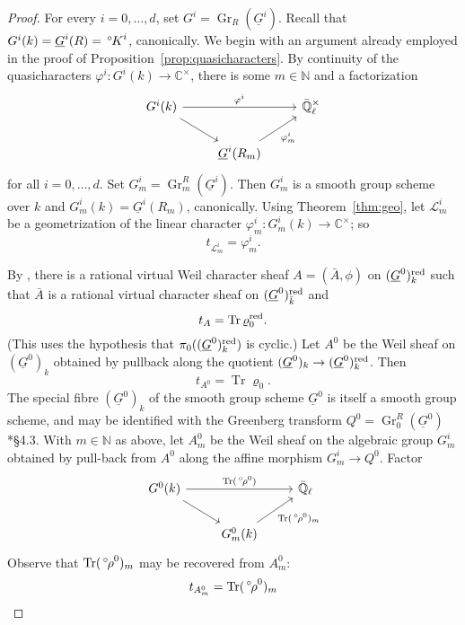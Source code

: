 \documentclass[10pt]{amsart}
\theoremstyle{plain}
\theoremstyle{definition}
\newcommand{\NN}{{\mathbb{N}}}
\newcommand{\CC}{{\mathbb{C}}}
\newcommand{\EE}{\mathbb{\bar Q}_\ell}
\newcommand{\bFq}{\bar{k}}
\newcommand{\Fq}{k}
\newcommand{\EEx}{\EE^\times}
\DeclareMathOperator{\Gr}{Gr}
\DeclareMathOperator{\trace}{Tr}
\newcommand{\trFrob}[1]{t_{#1}}
\newcommand{\cs}[1]{{\mathcal{#1}}}
\newcommand{\oK}{{\,^\circ \hskip-1pt K}}
\newcommand{\orho}{{\,^\circ \hskip-1pt \rho}}
\begin{document}
\begin{proof}
For every $i=0, \ldots ,d$, set $G^i = \Gr_{R}(\underline{G}^i)$.
Recall that $G^i(\Fq) = \underline{G}^i(R) = \oK^i$, canonically.
We begin with an argument already employed in the proof of Proposition~\ref{prop:quasicharacters}.
By continuity of the quasicharacters $\varphi^i : G^i(\Fq) \to \CC^\times$, there is some $m \in \NN$ and a factorization
\[
\begin{tikzcd}
G^i(\Fq) \arrow{rr}{\varphi^i} \arrow{rd} && \EEx\\
& \underline{G}^i(R_m) \arrow{ru}[swap]{\varphi^i_m} 
\end{tikzcd}
\] 
for all $i=0, \ldots, d$.
Set $G_m^i = \Gr_m^{R}(\underline{G}^i)$.
Then $G_m^i$ is a smooth group scheme over $\Fq$ and $G_m^i(\Fq) = \underline{G}^i(R_m)$, canonically.
Using Theorem~\ref{thm:geo}, let $\cs{L}^i_m$ be a geometrization of the linear character $\varphi^i_m: G_m^i(k) \to \CC^\times$; so
\[
\trFrob{\cs{L}^i_m} = \varphi^i_m.
\]

By \cite{lusztig:disconnected1}, there is a rational virtual Weil character sheaf $A = ({\bar A},\phi)$ on $(\underline{G}^0)_\Fq^\reductive$ such that ${\bar A}$ is a rational virtual character sheaf on $(\underline{G}^0)_{\bFq}^\reductive$ and
\[
\trFrob{A} = \trace \varrho_0^\reductive.
\]
(This uses the hypothesis that $\pi_0((\underline{G}^0)_\Fq^\reductive)$ is cyclic.)
%
Let $A^0$ be the Weil sheaf on $(\underline{G}^0)_\Fq$ obtained by pullback along the quotient $(\underline{G}^0)_\Fq \to (\underline{G}^0)_\Fq^\reductive$.
Then 
\[
\trFrob{A^0} = \trace \varrho_0.
\]
The special fibre $(\underline{G}^0)_\Fq$ of the smooth group scheme $\underline{G}^0$ is itself a smooth group scheme, and may be identified with the Greenberg transform $Q^0 = \Gr^{R}_0(\underline{G}^0)$ \cite{cunningham-roe:13a}*{\S 4.3}. 
With $m\in \NN$ as above, let ${A}_m^0$ be the Weil sheaf on the algebraic group $G_m^i$ obtained by pull-back from $A^0$ along the affine morphism $G_m^i \to Q^0$.
Factor
\begin{equation}\label{eqn:tracerho}
\begin{tikzcd}
G^0(\Fq) \arrow{rr}{\trace(\orho^0)} \arrow{rd} && \EE \\
& G_m^0(\Fq) \arrow{ru}[swap]{\trace(\orho^0)_m} 
\end{tikzcd}
\end{equation}
Observe that $\trace(\orho^0)_m$ may be recovered from ${A}_m^0$:
\[
\trFrob{{A}^0_m} = \trace(\orho^0)_m
\]


\end{proof}
\end{document}
